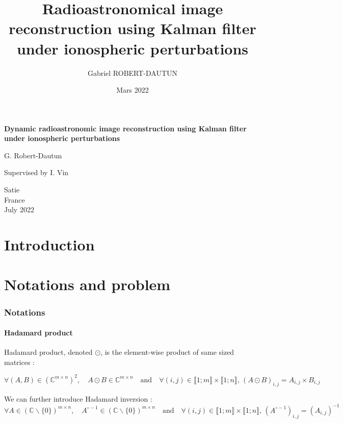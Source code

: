 \documentclass[titlepage]{article}
\author{Gabriel ROBERT-DAUTUN}
\date{Mars 2022}
\title{%
	Radioastronomical image reconstruction using Kalman filter under ionospheric perturbations}
\newcommand{\hinv}[1]{#1^{\circ-1}} %
\begin{document}
	
	\begin{titlepage}
	
	\vspace*{.3\textheight}
	\huge
	\centering
	\textbf{Dynamic radioastronomic image reconstruction using Kalman filter under ionospheric perturbations}
	
	\vspace{1cm}
	\LARGE
	G. Robert-Dautun
	
	\vfill
	\large
	Supervised by I. Vin
	
	\vspace{0.8cm}
	
	\Large
	Satie\\
	France\\
	July 2022
	
	\end{titlepage}
	
	\newpage
	\tableofcontents
	
	\newpage
	
	\part{Introduction}
	
	\newpage
	\part{Notations and problem}
	\section{Notations}
	
		\subsection{Hadamard product}
	
	Hadamard product, denoted $\odot$, is the element-wise product of same sized matrices :
	
	$$
	\forall (A,B)\in\left(\mathbb{C}^{m\times n}\right)^2, \quad A\odot B\in\mathbb{C}^{m\times n} \quad\text{and}\quad \forall (i,j)\in\llbracket1;m\rrbracket\times\llbracket1;n\rrbracket,\, (A\odot B)_{i,j} = A_{i,j}\times B_{i,j}
	$$
	
	We can further introduce Hadamard inversion :
	$$
	\forall A \in \left(\mathbb{C}\backslash\{0\}\right)^{m\times n},\quad \hinv{A}\in\left(\mathbb{C}\backslash\{0\}\right)^{m\times n} \quad\text{and}\quad \forall (i,j)\in\llbracket1;m\rrbracket\times\llbracket1;n\rrbracket,\, \left(\hinv{A}\right)_{i,j} = \left(A_{i,j}\right)^{-1}
	$$ 
	
\end{document}
